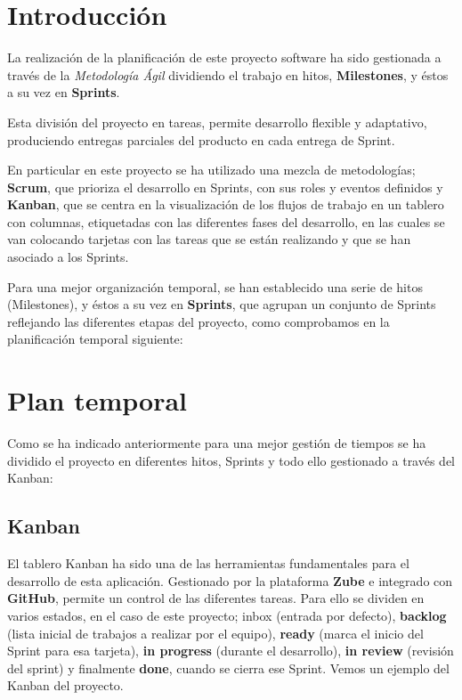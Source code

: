 
\section{Introducción}

La realización de la planificación de este proyecto software ha sido gestionada a través de la \textit{\gls{Metodología Ágil}} dividiendo el trabajo en hitos, \textbf{\gls{Milestone}s}, y éstos a su vez en \textbf{\gls{Sprint}s}.

Esta división del proyecto en tareas, permite desarrollo flexible y adaptativo, produciendo entregas parciales del producto en cada entrega de \gls{Sprint}.

En particular en este proyecto se ha utilizado una mezcla de metodologías; \textbf{\gls{Scrum}}, que prioriza el desarrollo en \gls{Sprint}s, con sus roles y eventos definidos y \textbf{\gls{Kanban}}, que se centra en la visualización de los flujos de trabajo en un tablero con columnas, etiquetadas con las diferentes fases del desarrollo, en las cuales se van colocando tarjetas con las tareas que se están realizando y que se han asociado a los \gls{Sprint}s.

Para una mejor organización temporal, se han establecido una serie de hitos (\gls{Milestone}s), y éstos a su vez en \textbf{\gls{Sprint}s}, que agrupan un conjunto de \gls{Sprint}s reflejando las diferentes etapas del proyecto, como comprobamos en la planificación temporal siguiente:

\section{Plan temporal}
Como se ha indicado anteriormente para una mejor gestión de tiempos se ha dividido el proyecto en diferentes hitos, \gls{Sprint}s y todo ello gestionado a través del \gls{Kanban}:
\subsection{\gls{Kanban}}
El tablero \gls{Kanban} ha sido una de las herramientas fundamentales para el desarrollo de esta aplicación. Gestionado por la plataforma \textbf{Zube} e integrado con \textbf{GitHub}, permite un control de las diferentes tareas. Para ello se dividen en varios estados, en el caso de este proyecto; inbox (entrada por defecto), \textbf{backlog} (lista inicial de trabajos a realizar por el equipo), \textbf{ready} (marca el inicio del \gls{Sprint} para esa tarjeta), \textbf{in progress} (durante el desarrollo), \textbf{in review} (revisión del sprint) y finalmente \textbf{done}, cuando se cierra ese \gls{Sprint}.
Vemos un ejemplo del \gls{Kanban} del proyecto.
